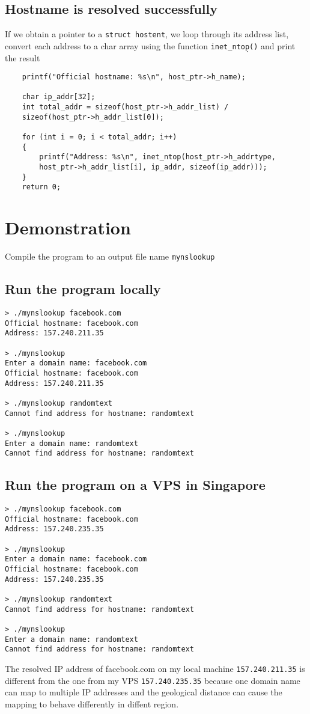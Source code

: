 \documentclass[12pt]{article}
\begin{document}
\subsection{Hostname is resolved successfully}
If we obtain a pointer to a \Verb"struct hostent", we loop through its address list, convert each address to a char array using the function \Verb"inet_ntop̣()" and print the result 
\begin{verbatim}
    printf("Official hostname: %s\n", host_ptr->h_name);

    char ip_addr[32];
    int total_addr = sizeof(host_ptr->h_addr_list) /
    sizeof(host_ptr->h_addr_list[0]);

    for (int i = 0; i < total_addr; i++)
    {
        printf("Address: %s\n", inet_ntop(host_ptr->h_addrtype,
        host_ptr->h_addr_list[i], ip_addr, sizeof(ip_addr)));
    }
    return 0;
\end{verbatim}


\clearpage
\section{Demonstration}
Compile the program to an output file name \Verb"mynslookup"
\subsection{Run the program locally}
\begin{verbatim}
> ./mynslookup facebook.com
Official hostname: facebook.com
Address: 157.240.211.35

> ./mynslookup
Enter a domain name: facebook.com
Official hostname: facebook.com
Address: 157.240.211.35

> ./mynslookup randomtext
Cannot find address for hostname: randomtext

> ./mynslookup
Enter a domain name: randomtext
Cannot find address for hostname: randomtext
\end{verbatim}
\subsection{Run the program on a VPS in Singapore}
\begin{verbatim}
> ./mynslookup facebook.com
Official hostname: facebook.com
Address: 157.240.235.35

> ./mynslookup
Enter a domain name: facebook.com
Official hostname: facebook.com
Address: 157.240.235.35

> ./mynslookup randomtext
Cannot find address for hostname: randomtext

> ./mynslookup
Enter a domain name: randomtext
Cannot find address for hostname: randomtext
\end{verbatim}
The resolved IP address of facebook.com on my local machine \Verb"157.240.211.35" is different from the one from my VPS \Verb"157.240.235.35" because one domain name can map to multiple IP addresses and the geological distance can cause the mapping to behave differently in diffent region.
\clearpage
\end{document}

